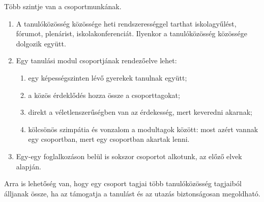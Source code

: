 Több szintje van a csoportmunkának.

\begin{enumerate}
\def\labelenumi{\arabic{enumi}.}
\tightlist
\item
  A tanulóközösség közössége heti rendszerességgel tarthat
  iskolagyűlést, fórumot, plenárist, iskolakonferenciát. Ilyenkor a
  tanulóközösség közössége dolgozik együtt.
\item
  Egy tanulási modul csoportjának rendezőelve lehet:

  \begin{enumerate}
  \def\labelenumii{\alph{enumii}.}
  \tightlist
  \item
    egy képességszinten lévő gyerekek tanulnak együtt;
  \item
    a közös érdeklődés hozza össze a csoporttagokat;
  \item
    direkt a véletlenszerűségben van az érdekesség, mert keveredni
    akarnak;
  \item
    kölcsönös szimpátia és vonzalom a modultagok között: most azért
    vannak egy csoportban, mert egy csoportban akartak lenni.
  \end{enumerate}
\item
  Egy-egy foglalkozáson belül is sokszor csoportot alkotunk, az előző
  elvek alapján.
\end{enumerate}

Arra is lehetőség van, hogy egy csoport tagjai több tanulóközösség
tagjaiból álljanak össze, ha az támogatja a tanulást és az utazás
biztonságosan megoldható.
